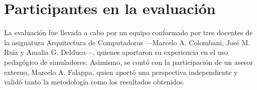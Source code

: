 \documentclass[12pt,oneside]{templates/unerthesis}
\begin{document}
\begin{table}[!h]
\centering
\caption{\label{tab:simuladores}Proceso de selección de simuladores}
\centering
{}
\end{table}

\hypertarget{participantes-en-la-evaluaciuxf3n}{%
\section{Participantes en la evaluación}\label{participantes-en-la-evaluaciuxf3n}}

La evaluación fue llevada a cabo por un equipo conformado por tres docentes de la asignatura Arquitectura de Computadoras ---Marcelo A. Colombani, José M. Ruiz y Amalia G. Delduca---, quienes aportaron su experiencia en el uso pedagógico de simuladores. Asimismo, se contó con la participación de un asesor externo, Marcelo A. Falappa, quien aportó una perspectiva independiente y validó tanto la metodología como los resultados obtenidos.
\end{document}
